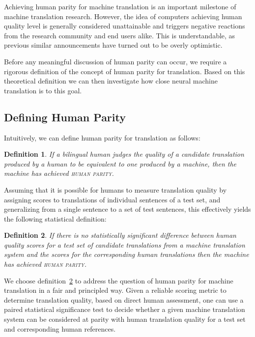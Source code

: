 \documentclass[a4paper]{article}
\begin{document}
\begin{CJK*}{UTF8}{gbsn}
\newtheorem{definition}{Definition}

Achieving human parity for machine translation is an important milestone of machine translation research. However, the idea of computers achieving human quality level is generally considered unattainable and triggers negative reactions from the research community and end users alike. This is understandable, as previous similar announcements have turned out to be overly optimistic.

Before any meaningful discussion of human parity can occur, we require a rigorous definition of the concept of human parity for translation. Based on this theoretical definition we can then investigate how close neural machine translation is to this goal.



\subsection{Defining Human Parity}

Intuitively, we can define human parity for translation as follows:


\begin{definition}
If a bilingual human judges the quality of a candidate translation produced by a human to be equivalent to one produced by a machine, then the machine has achieved \textsc{human parity}.
\end{definition}











Assuming that it is possible for humans to measure translation quality by assigning scores to translations of individual sentences of a test set, and generalizing from a single sentence to a set of test sentences, this effectively yields the following statistical definition:

\begin{definition}
\label{def:human-parity}
If there is no statistically significant difference between human quality scores for a test set of candidate translations from a machine translation system and the scores for the corresponding human translations then the machine has achieved \textsc{human parity}.
\end{definition}



We choose definition~\ref{def:human-parity} to address the question of human parity for machine translation in a fair and principled way. Given a reliable scoring metric to determine translation quality, based on direct human assessment, one can use a paired statistical significance test to decide whether a given machine translation system can be considered at parity with human translation quality for a test set and corresponding human references.


\end{CJK*}
\end{document}
